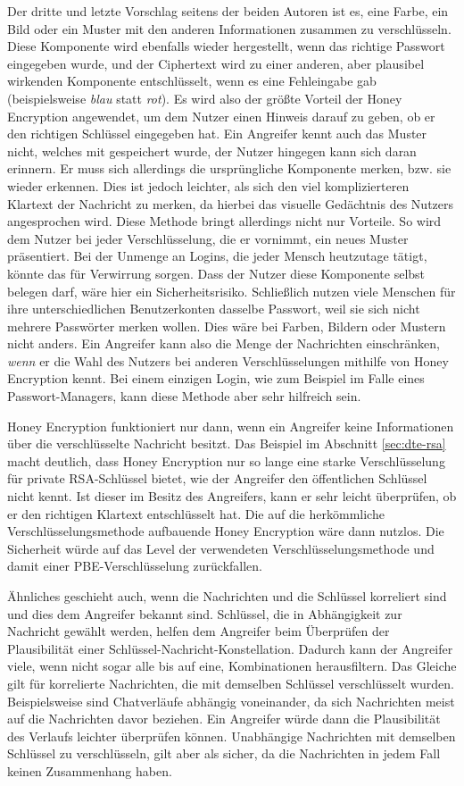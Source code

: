 Der dritte und letzte Vorschlag seitens der beiden Autoren ist es, eine Farbe, ein Bild oder ein Muster mit den anderen Informationen zusammen zu verschlüsseln. Diese Komponente wird ebenfalls wieder hergestellt, wenn das richtige Passwort eingegeben wurde, und der Ciphertext wird zu einer anderen, aber plausibel wirkenden Komponente entschlüsselt, wenn es eine Fehleingabe gab (beispielsweise \emph{blau} statt \emph{rot}). Es wird also der größte Vorteil der Honey Encryption angewendet, um dem Nutzer einen Hinweis darauf zu geben, ob er den richtigen Schlüssel eingegeben hat. Ein Angreifer kennt auch das Muster nicht, welches mit gespeichert wurde, der Nutzer hingegen kann sich daran erinnern. Er muss sich allerdings die ursprüngliche Komponente merken, bzw. sie wieder erkennen. Dies ist jedoch leichter, als sich den viel komplizierteren Klartext der Nachricht zu merken, da hierbei das visuelle Gedächtnis des Nutzers angesprochen wird. Diese Methode bringt allerdings nicht nur Vorteile. So wird dem Nutzer bei jeder Verschlüsselung, die er vornimmt, ein neues Muster präsentiert. Bei der Unmenge an Logins, die jeder Mensch heutzutage tätigt, könnte das für Verwirrung sorgen. Dass der Nutzer diese Komponente selbst belegen darf, wäre hier ein Sicherheitsrisiko. Schließlich nutzen viele Menschen für ihre unterschiedlichen Benutzerkonten dasselbe Passwort, weil sie sich nicht mehrere Passwörter merken wollen. Dies wäre bei Farben, Bildern oder Mustern nicht anders. Ein Angreifer kann also die Menge der Nachrichten einschränken, \emph{wenn} er die Wahl des Nutzers bei anderen Verschlüsselungen mithilfe von Honey Encryption kennt. Bei einem einzigen Login, wie zum Beispiel im Falle eines Passwort-Managers, kann diese Methode aber sehr hilfreich sein.

Honey Encryption funktioniert nur dann, wenn ein Angreifer keine Informationen über die verschlüsselte Nachricht besitzt. Das Beispiel im Abschnitt \ref{sec:dte-rsa} macht deutlich, dass Honey Encryption nur so lange eine starke Verschlüsselung für private RSA-Schlüssel bietet, wie der Angreifer den öffentlichen Schlüssel nicht kennt. Ist dieser im Besitz des Angreifers, kann er sehr leicht überprüfen, ob er den richtigen Klartext entschlüsselt hat. Die auf die herkömmliche Verschlüsselungsmethode aufbauende Honey Encryption wäre dann nutzlos. Die Sicherheit würde auf das Level der verwendeten Verschlüsselungsmethode und damit einer PBE-Verschlüsselung zurückfallen.

Ähnliches geschieht auch, wenn die Nachrichten und die Schlüssel korreliert sind und dies dem Angreifer bekannt sind. Schlüssel, die in Abhängigkeit zur Nachricht gewählt werden, helfen dem Angreifer beim Überprüfen der Plausibilität einer Schlüssel-Nachricht-Konstellation. Dadurch kann der Angreifer viele, wenn nicht sogar alle bis auf eine, Kombinationen herausfiltern. Das Gleiche gilt für korrelierte Nachrichten, die mit demselben Schlüssel verschlüsselt wurden. Beispielsweise sind Chatverläufe abhängig voneinander, da sich Nachrichten meist auf die Nachrichten davor beziehen. Ein Angreifer würde dann die Plausibilität des Verlaufs leichter überprüfen können. Unabhängige Nachrichten mit demselben Schlüssel zu verschlüsseln, gilt aber als sicher, da die Nachrichten in jedem Fall keinen Zusammenhang haben.